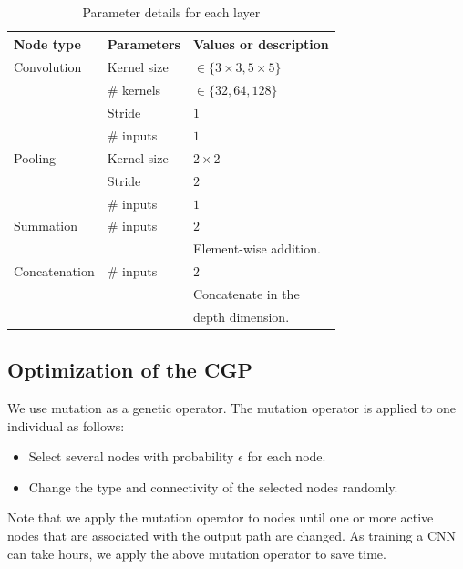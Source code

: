 \begin{table}[tb]
  \caption{Parameter details for each layer}
  \label{layer_param}
  \begin{tabular}{l|l|l} \hline
    Node type & Parameters & Values or description \\ \hline
    Convolution & Kernel size & $\in \{3\times 3, 5\times 5\}$ \\ 
                        & \# kernels & $\in \{32, 64, 128\}$ \\ 
                       & Stride & $1$ \\ 
                       & \# inputs & $1$ \\ \hline
      Pooling     & Kernel size & $2\times 2$ \\ 
                       & Stride & $2$ \\ 
                       & \# inputs & $1$ \\ \hline
     Summation & \# inputs & $2$ \\ 
                         &                & Element-wise addition. \\ \hline
 Concatenation & \# inputs & $2$ \\ 
                      &  & Concatenate in the \\
                       &  & depth dimension.\\  \hline
  \end{tabular}
\end{table}

\subsection{Optimization of the CGP}
We use mutation as a genetic operator.
The mutation operator is applied to one individual as follows:
\begin{itemize}
  \item Select several nodes with probability $\epsilon$ for each node.
  \item Change the type and connectivity of the selected nodes randomly.
\end{itemize}
Note that we apply the mutation operator to nodes until one or more active nodes that are associated with the output path are changed.
As training a CNN can take hours, we apply the above mutation operator to save time.


